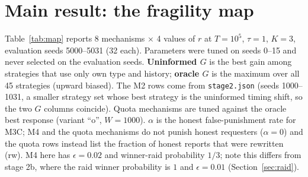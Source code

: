 \documentclass[10pt]{article}
\begin{document}
\section{Main result: the fragility map}\label{sec:map}
Table~\ref{tab:map} reports 8 mechanisms $\times$ 4 values of $r$ at $T=10^5$, $\tau=1$, $K=3$, evaluation seeds 5000--5031 (32 each). Parameters were tuned on seeds 0--15 and never selected on the evaluation seeds. \textbf{Uninformed $G$} is the best gain among strategies that use only own type and history; \textbf{oracle $G$} is the maximum over all 45 strategies (upward biased). The M2 rows come from \texttt{stage2.json} (seeds 1000--1031, a smaller strategy set whose best strategy is the uninformed timing shift, so the two $G$ columns coincide). Quota mechanisms are tuned against the oracle best response (variant ``o'', $W=1000$). $\alpha$ is the honest false-punishment rate for M3C; M4 and the quota mechanisms do not punish honest requesters ($\alpha=0$) and the quota rows instead list the fraction of honest reports that were rewritten (rw). M4 here has $\epsilon=0.02$ and winner-raid probability $1/3$; note this differs from stage 2b, where the raid winner probability is $1$ and $\epsilon=0.01$ (Section~\ref{sec:raid}).
\end{document}
